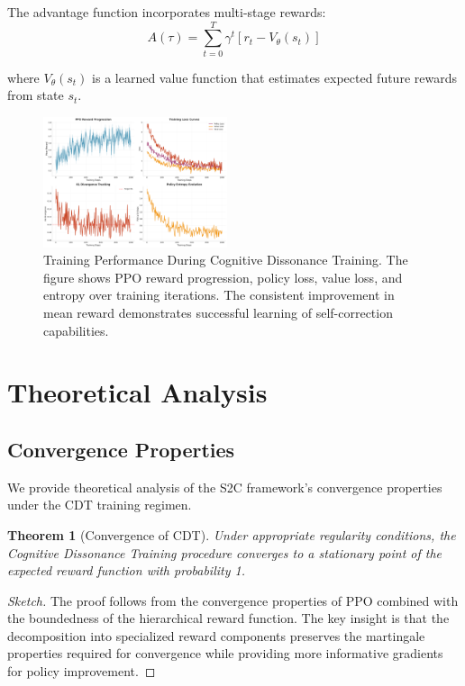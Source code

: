 \documentclass[10pt,twocolumn]{article}
\newtheorem{theorem}{Theorem}
\newcommand{\ssc}{\textsc{S2C}}
\newcommand{\cdt}{\textsc{CDT}}
\begin{document}
The advantage function incorporates multi-stage rewards:
\begin{equation}
A(\tau) = \sum_{t=0}^{T} \gamma^t [r_t - V_\theta(s_t)]
\end{equation}

where $V_\theta(s_t)$ is a learned value function that estimates expected future rewards from state $s_t$.

\begin{figure}[t]
\centering
\includegraphics[width=0.48\textwidth]{graphs/training_performance_curves.pdf}
\caption{Training Performance During Cognitive Dissonance Training. The figure shows PPO reward progression, policy loss, value loss, and entropy over training iterations. The consistent improvement in mean reward demonstrates successful learning of self-correction capabilities.}
\label{fig:training_curves}
\end{figure}

\section{Theoretical Analysis}

\subsection{Convergence Properties}

We provide theoretical analysis of the \ssc{} framework's convergence properties under the \cdt{} training regimen.

\begin{theorem}[Convergence of CDT]
Under appropriate regularity conditions, the Cognitive Dissonance Training procedure converges to a stationary point of the expected reward function with probability 1.
\end{theorem}

\begin{proof}[Sketch]
The proof follows from the convergence properties of PPO combined with the boundedness of the hierarchical reward function. The key insight is that the decomposition into specialized reward components preserves the martingale properties required for convergence while providing more informative gradients for policy improvement.
\end{proof}
\end{document}
